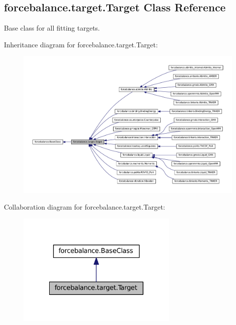 \hypertarget{classforcebalance_1_1target_1_1Target}{\subsection{forcebalance.\-target.\-Target \-Class \-Reference}
\label{classforcebalance_1_1target_1_1Target}
}


\-Base class for all fitting targets.  




\-Inheritance diagram for forcebalance.\-target.\-Target\-:
\nopagebreak
\begin{figure}[H]
\begin{center}
\leavevmode
\includegraphics[width=350pt]{classforcebalance_1_1target_1_1Target__inherit__graph}
\end{center}
\end{figure}


\-Collaboration diagram for forcebalance.\-target.\-Target\-:
\nopagebreak
\begin{figure}[H]
\begin{center}
\leavevmode
\includegraphics[width=222pt]{classforcebalance_1_1target_1_1Target__coll__graph}
\end{center}
\end{figure}
